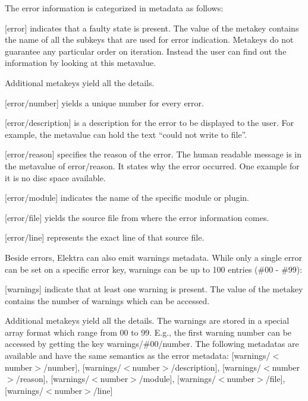 The error information is categorized in metadata as follows\+:


\begin{DoxyItemize}
\item \mbox{[}error\mbox{]} indicates that a faulty state is present. The value of the metakey contains the name of all the subkeys that are used for error indication. Metakeys do not guarantee any particular order on iteration. Instead the user can find out the information by looking at this metavalue.
\end{DoxyItemize}

Additional metakeys yield all the details.


\begin{DoxyItemize}
\item \mbox{[}error/number\mbox{]} yields a unique number for every error.
\item \mbox{[}error/description\mbox{]} is a description for the error to be displayed to the user. For example, the metavalue can hold the text “could not write to file”.
\item \mbox{[}error/reason\mbox{]} specifies the reason of the error. The human readable message is in the metavalue of {\ttfamily error/reason}. It states why the error occurred. One example for it is \textquotesingle{}\textquotesingle{}no disc space available\textquotesingle{}\textquotesingle{}.
\item \mbox{[}error/module\mbox{]} indicates the name of the specific module or plugin.
\item \mbox{[}error/file\mbox{]} yields the source file from where the error information comes.
\item \mbox{[}error/line\mbox{]} represents the exact line of that source file.
\end{DoxyItemize}

Beside errors, Elektra can also emit warnings metadata. While only a single error can be set on a specific error key, warnings can be up to 100 entries (\#00 -\/ \#99)\+:


\begin{DoxyItemize}
\item \mbox{[}warnings\mbox{]} indicate that at least one warning is present. The value of the metakey contains the number of warnings which can be accessed.
\end{DoxyItemize}

Additional metakeys yield all the details. The warnings are stored in a special array format which range from 00 to 99. E.\+g., the first warning number can be accessed by getting the key {\ttfamily warnings/\#00/number}. The following metadatas are available and have the same semantics as the error metadata\+: {\ttfamily \mbox{[}warnings/$<$number$>$/number\mbox{]}}, {\ttfamily \mbox{[}warnings/$<$number$>$/description\mbox{]}}, {\ttfamily \mbox{[}warnings/$<$number$>$/reason\mbox{]}}, {\ttfamily \mbox{[}warnings/$<$number$>$/module\mbox{]}}, {\ttfamily \mbox{[}warnings/$<$number$>$/file\mbox{]}}, {\ttfamily \mbox{[}warnings/$<$number$>$/line\mbox{]}}

